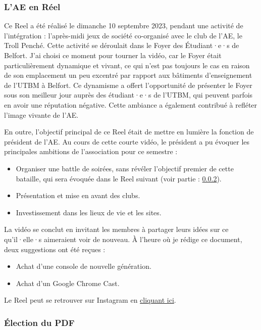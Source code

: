 \subsubsection{L'\gls{AE} en Réel}\label{subsubsec:ae-en-reel}

Ce Reel a été réalisé le dimanche 10 septembre 2023, pendant une activité de l'intégration : l'après-midi jeux de société co-organisé avec le club de l'\gls{AE}, le Troll Penché.
Cette activité se déroulait dans le Foyer des Étudiant·e·s de Belfort.
J'ai choisi ce moment pour tourner la vidéo, car le Foyer était particulièrement dynamique et vivant, ce qui n'est pas toujours le cas en raison de son emplacement un peu excentré par rapport aux bâtiments d'enseignement de l'\gls{UTBM} à Belfort.
Ce dynamisme a offert l'opportunité de présenter le Foyer sous son meilleur jour auprès des étudiant·e·s de l'\gls{UTBM}, qui peuvent parfois en avoir une réputation négative.
Cette ambiance a également contribué à refléter l'image vivante de l'\gls{AE}.

En outre, l'objectif principal de ce Reel était de mettre en lumière la fonction de président de l'\gls{AE}.
Au cours de cette courte vidéo, le président a pu évoquer les principales ambitions de l'association pour ce semestre :
\begin{itemize}
    \item Organiser une battle de soirées, sans révéler l'objectif premier de cette bataille, qui sera évoquée dans le Reel suivant (voir partie : \ref{subsubsec:election-pdf}).
    \item Présentation et mise en avant des clubs.
    \item Investissement dans les lieux de vie et les sites.
\end{itemize}

La vidéo se conclut en invitant les membres à partager leurs idées sur ce qu'il·elle·s aimeraient voir de nouveau.
À l'heure où je rédige ce document, deux suggestions ont été reçues :
\begin{itemize}
    \item Achat d'une console de nouvelle génération.
    \item Achat d'un Google Chrome Cast.
\end{itemize}

Le Reel peut se retrouver sur Instagram en \href{https://www.instagram.com/reel/CxGShAusxDq/?utm_source=ig_web_copy_link&igshid=MzRlODBiNWFlZA==}{cliquant ici}.


\subsubsection{Élection du \gls{PDF}}\label{subsubsec:election-pdf}


